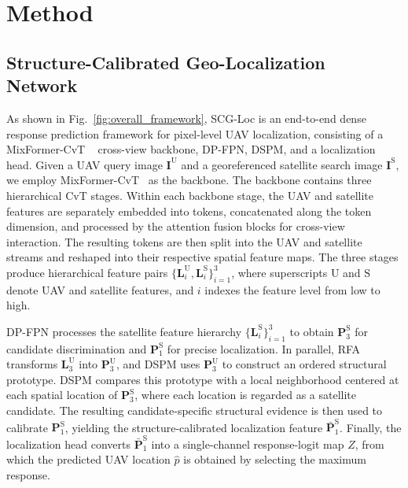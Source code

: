 \documentclass[runningheads]{llncs}
\begin{document}
\section{Method}

\subsection{Structure-Calibrated Geo-Localization Network}

As shown in Fig.~\ref{fig:overall_framework}, SCG-Loc is an end-to-end dense response prediction framework for pixel-level UAV localization, consisting of a MixFormer-CvT ~\cite{cui2022mixformer,wu2021cvt} cross-view backbone, DP-FPN, DSPM, and a localization head. Given a UAV query image $\mathbf{I}^{\mathrm{U}}$ and a georeferenced satellite search image $\mathbf{I}^{\mathrm{S}}$, we employ MixFormer-CvT~\cite{cui2022mixformer} as the backbone. The backbone contains three hierarchical CvT stages. Within each backbone stage, the UAV and satellite features are separately embedded into tokens, concatenated along the token dimension, and processed by the attention fusion blocks for cross-view interaction. The resulting tokens are then split into the UAV and satellite streams and reshaped into their respective spatial feature maps. The three stages produce hierarchical feature pairs $\{\mathbf{L}_{i}^{\mathrm{U}},\mathbf{L}_{i}^{\mathrm{S}}\}_{i=1}^{3}$, where superscripts $\mathrm{U}$ and $\mathrm{S}$ denote UAV and satellite features, and $i$ indexes the feature level from low to high.

DP-FPN processes the satellite feature hierarchy $\{\mathbf{L}_{i}^{\mathrm{S}}\}_{i=1}^{3}$ to obtain $\mathbf{P}_{3}^{\mathrm{S}}$ for candidate discrimination and $\mathbf{P}_{1}^{\mathrm{S}}$ for precise localization. In parallel, RFA transforms $\mathbf{L}_{3}^{\mathrm{U}}$ into $\mathbf{P}_{3}^{\mathrm{U}}$, and DSPM uses $\mathbf{P}_{3}^{\mathrm{U}}$ to construct an ordered structural prototype. DSPM compares this prototype with a local neighborhood centered at each spatial location of $\mathbf{P}_{3}^{\mathrm{S}}$, where each location is regarded as a satellite candidate. The resulting candidate-specific structural evidence is then used to calibrate $\mathbf{P}_{1}^{\mathrm{S}}$, yielding the structure-calibrated localization feature $\bar{\mathbf{P}}_{1}^{\mathrm{S}}$. Finally, the localization head converts $\bar{\mathbf{P}}_{1}^{\mathrm{S}}$ into a single-channel response-logit map $Z$, from which the predicted UAV location $\hat{p}$ is obtained by selecting the maximum response.
\end{document}
